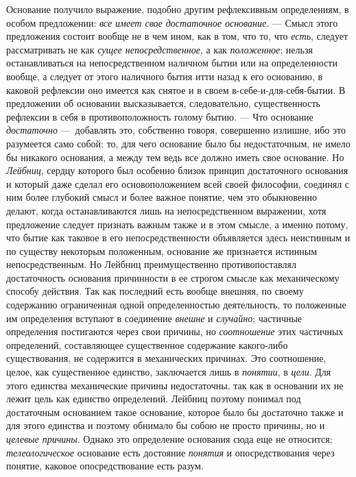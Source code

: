 Основание получило выражение, подобно другим рефлексивным определениям, в
особом предложении: {\em все имеет свое достаточное
основание}. — Смысл этого предложения состоит вообще не в чем ином, как в
том, что то, что {\em есть}, следует рассматривать не
как {\em сущее непосредственное}, а как
{\em положенное}; нельзя останавливаться на
непосредственном наличном бытии или на определенности вообще, а следует от
этого наличного бытия итти назад к его основанию, в каковой рефлексии оно
имеется как снятое и в своем в-себе-и-для-себя-бытии. В предложении об
основании высказывается, следовательно, существенность рефлексии в себя в
противоположность голому бытию. — Что основание
{\em достаточно} —~добавлять это, собственно говоря,
совершенно излишне, ибо это разумеется само собой; то, для чего основание
было бы недостаточным, не имело бы никакого основания, а между тем ведь все
должно иметь свое основание. Но {\em Лейбниц}, сердцу
которого был особенно близок принцип достаточного основания и который даже
сделал его основоположением всей своей философии, соединял с ним более
глубокий смысл и более важное понятие, чем это обыкновенно делают, когда
останавливаются лишь на непосредственном выражении, хотя предложение
следует признать важным также и в этом смысле, а именно потому, что бытие
как таковое в его непосредственности объявляется здесь неистинным и по
существу некоторым положенным, основание же признается истинным
непосредственным. Но Лейбниц преимущественно противопоставлял достаточность
основания причинности в ее строгом смысле как механическому способу
действия. Так как последний есть вообще внешняя, по своему содержанию
ограниченная одной определенностью деятельность, то положенные им
определения вступают в соединение {\em внешне} и
{\em случайно}; частичные определения постигаются через
свои причины, но {\em соотношение} этих частичных
определений, составляющее существенное содержание какого-либо
существования, не содержится в механических причинах. Это соотношение,
целое, как существенное единство, заключается лишь в
{\em понятии}, в {\em цели}. Для
этого единства механические причины недостаточны, так как в основании их не
лежит цель как единство определений. Лейбниц поэтому понимал под
достаточным основанием такое основание, которое было бы достаточно также и
для этого единства и поэтому обнимало бы собою не просто причины, но и
{\em целевые причины}. Однако это определение основания
сюда еще не относится; {\em телеологическое} основание
есть достояние {\em понятия} и опосредствования через
понятие, каковое опосредствование есть разум.

